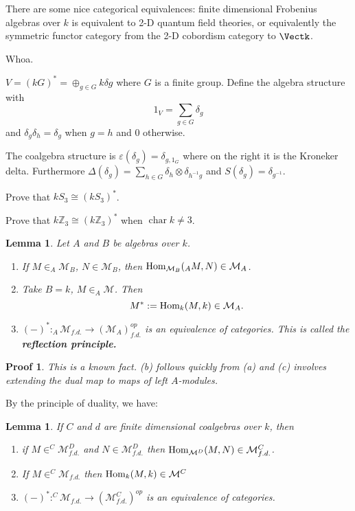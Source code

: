 \documentclass[12pt]{article}
\theoremstyle{break}
\theoremstyle{nonumberbreak}
\theoremstyle{changebreak}
\newtheorem{lem}[thm]{Lemma}
\theoremstyle{break}
\theoremstyle{nonumberbreak}
\newtheorem{prf}{Proof}
\theoremstyle{nonumberplain}
\theoremstyle{change}
\newcommand*{\Z}{
\mathbb{Z}
}
\DeclareMathOperator{\ch}{char}
\newcommand*{\Hom}{\ensuremath\text{Hom}}
\begin{document}
There are some nice categorical equivalences: finite dimensional Frobenius algebras over $k$ is
equivalent to 2-D quantum field theories, or equivalently the symmetric functor category from the 2-D cobordism category to $\Vectk$.

Whoa.

\begin{ex}
	$V=(kG)^*=\oplus_{g\in G}k\delta g$ where $G$ is a finite group. Define the algebra structure with
	\[1_V=\sum_{g\in G}\delta_g\]
	and $\delta_g\delta_h=\delta_g$ when $g=h$ and 0 otherwise.

	The coalgebra structure is $\varepsilon(\delta_g)=\delta_{g,1_G}$ where on the right it is the Kroneker delta.
	Furthermore $\Delta(\delta_g)=\sum_{h\in G}\delta_h\otimes\delta_{h^{-1}g}$ and $S(\delta_g)=\delta_{g^{-1}}$.
\end{ex}

\begin{prob}
	Prove that $kS_3\cong(kS_3)^*$.
\end{prob}
\begin{prob}
	Prove that $k\Z_3\cong(k\Z_3)^*$ when $\ch k\ne 3$.
\end{prob}

\begin{lem}
	Let $A$ and $B$ be algebras over $k$.
	\begin{enumerate}
		\item If $M\in_A\mathcal{M}_B$, $N\in \mathcal{M}_B$, then $\Hom_{\mathcal{M}_B}(_AM,N)\in\mathcal{M}_A$.
		\item Take $B=k$, $M\in _A\mathcal{M}$. Then
		\[M^*:=\Hom_k(M,k)\in\mathcal{M}_A.\]
		\item $(-)^*:_A\mathcal{M}_{f.d.}\to (\mathcal{M}_A)_{f.d.}^{op}$ is an equivalence of categories. This is called the \textbf{reflection principle.}
	\end{enumerate}
\end{lem}
\begin{prf}
	This is a known fact. (b) follows quickly from (a) and (c) involves extending the dual map to maps of left $A$-modules.
\end{prf}
By the principle of duality, we have:
\begin{lem}
	If $C$ and $d$ are finite dimensional coalgebras over $k$, then
	\begin{enumerate}
		\item if $M\in ^C\mathcal{M}^D_{f.d.}$ and $N\in \mathcal{M}^D_{f.d.}$ then $\Hom_{\mathcal{M}^D}(M,N)\in\mathcal{M}^C_{f.d.}$.
		\item If $M\in ^C\mathcal{M}_{f.d.}$ then $\Hom_k(M,k)\in\mathcal{M}^C$
		\item $(-)^*:^C\mathcal{M}_{f.d.}\to(\mathcal{M}_{f.d.}^C)^{op}$ is an equivalence of categories.
	\end{enumerate}
\end{lem}
\end{document}
